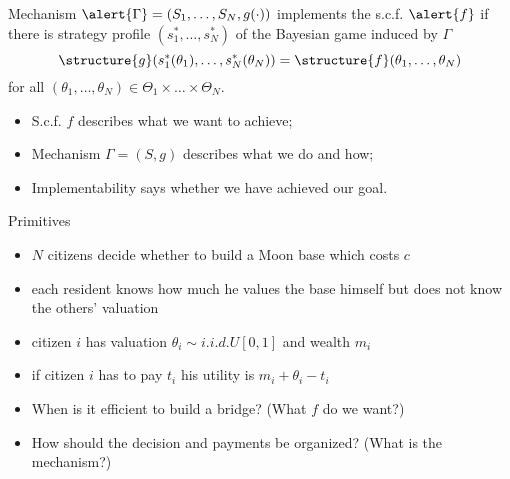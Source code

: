 \documentclass[english]{beamer}		%
\def\lyxframeend{} %
\begin{document}
\begin{definition}[implementation]
	Mechanism $\alert{\Gamma}=(S_{1},\dots,S_{N},g(\cdot))$ \alert{implements} the s.c.f. $\alert{f}$ if there is  strategy profile $(s_{1}^{*},\dots,s_{N}^{*})$ of the Bayesian game induced by $\Gamma$  
	$$\structure{g}(s_{1}^{*}(\theta_{1}),\dots,s_{N}^{*}(\theta_{N})) = \structure{f} (\theta_{1},\dots,\theta_{N})$$ 
	for all $(\theta_{1},\dots,\theta_{N})\in\Theta_{1}\times\dots \times\Theta_{N}$.
\end{definition}
\lyxframeend


\begin{itemize}
	\item S.c.f. $f$ describes what we want to achieve;
	\item Mechanism $\Gamma = (S,g)$ describes what we do and how;
	\item Implementability says whether we have achieved our goal.
\end{itemize}
\lyxframeend


\begin{exampleblock}{Primitives}
	\begin{itemize}
		\item $N$ citizens decide whether to build a Moon base which costs $c$
		\item each resident knows how much he values the base himself but does not know the others' valuation
		\item citizen $i$ has valuation $\theta_{i} \sim i.i.d.U[0,1]$ and wealth $m_{i}$
		\item if citizen $i$ has to pay $t_{i}$ his utility is $m_{i}+\theta_{i}-t_{i}$
	\end{itemize}
\end{exampleblock}
\begin{itemize}
	\item When is it efficient to build a bridge? (What $f$ do we want?)
	\item How should the decision and payments be organized? (What is the mechanism?)
\end{itemize}
\lyxframeend
\end{document}

